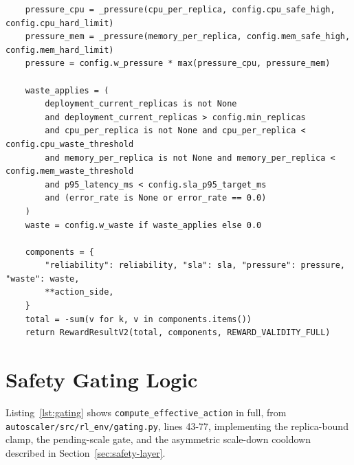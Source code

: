 \begin{lstlisting}
    pressure_cpu = _pressure(cpu_per_replica, config.cpu_safe_high, config.cpu_hard_limit)
    pressure_mem = _pressure(memory_per_replica, config.mem_safe_high, config.mem_hard_limit)
    pressure = config.w_pressure * max(pressure_cpu, pressure_mem)

    waste_applies = (
        deployment_current_replicas is not None
        and deployment_current_replicas > config.min_replicas
        and cpu_per_replica is not None and cpu_per_replica < config.cpu_waste_threshold
        and memory_per_replica is not None and memory_per_replica < config.mem_waste_threshold
        and p95_latency_ms < config.sla_p95_target_ms
        and (error_rate is None or error_rate == 0.0)
    )
    waste = config.w_waste if waste_applies else 0.0

    components = {
        "reliability": reliability, "sla": sla, "pressure": pressure, "waste": waste,
        **action_side,
    }
    total = -sum(v for k, v in components.items())
    return RewardResultV2(total, components, REWARD_VALIDITY_FULL)
\end{lstlisting}

\section{Safety Gating Logic}

Listing~\ref{lst:gating} shows \texttt{compute\_\allowbreak effective\_\allowbreak action} in full,
from \texttt{autoscaler/\allowbreak \allowbreak src/\allowbreak \allowbreak rl\_\allowbreak env/\allowbreak \allowbreak gating.py}, lines 43-77, implementing
the replica-bound clamp, the pending-scale gate, and the asymmetric
scale-down cooldown described in Section~\ref{sec:safety-layer}.

